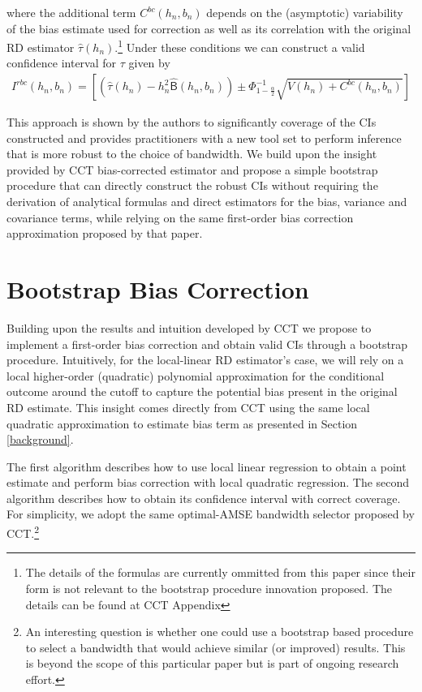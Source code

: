 \documentclass[12pt,fleqn]{article}
\begin{document}
where the additional term $C^{bc}(h_{n}, b_{n})$ depends on the (asymptotic) variability of the bias estimate used for correction as well as its correlation with the original RD estimator $\hat{\tau}(h_{n})$.\footnote{The details of the formulas are currently ommitted from this paper since their form is not relevant to the bootstrap procedure innovation proposed. The details can be found at CCT Appendix}  Under these conditions we can construct a valid confidence interval for $\tau$ given by
 \begin{align}
  I^{rbc}(h_{n}, b_{n})=\left[\left(\hat{\tau}(h_{n})-h_{n}^{2}\hat{\mathsf{B}}(h_{n},b_{n})\right)\pm \Phi^{-1}_{1-\frac{\alpha}{2}}\sqrt{V(h_{n})+C^{bc}(h_{n}, b_{n})} \right]
 \end{align}

This approach is shown by the authors to significantly coverage of the CIs constructed and provides practitioners with a new tool set to perform inference that is more robust to the choice of bandwidth. We build upon the insight provided by CCT bias-corrected estimator and propose a simple bootstrap procedure that can directly construct the robust CIs without requiring the derivation of analytical formulas and direct estimators for the bias, variance and covariance terms, while relying on the same first-order bias correction approximation proposed by that paper.

\section{Bootstrap Bias Correction}\label{boot}

Building upon the results and intuition developed by CCT we propose to implement a first-order bias correction and obtain valid CIs through a bootstrap procedure.
Intuitively, for the local-linear RD estimator's case, we will rely on a local higher-order (quadratic) polynomial approximation for the conditional outcome around the cutoff to capture the potential bias present in the original RD estimate. This insight comes directly from CCT using the same local quadratic approximation to estimate bias term as presented in Section \ref{background}.

The first algorithm describes how to use local linear regression to obtain a point estimate and perform bias correction with local quadratic regression. The second algorithm describes how to obtain its confidence interval with correct coverage. For simplicity, we adopt the same optimal-AMSE bandwidth selector proposed by CCT.\footnote{An interesting question is whether one could use a bootstrap based procedure to select a bandwidth that would achieve similar (or improved) results. This is beyond the scope of this particular paper but is part of ongoing research effort.} 
\end{document}
